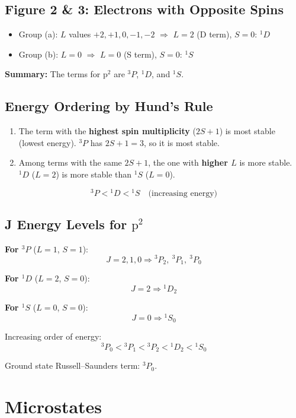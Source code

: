 \documentclass[12pt,a4paper]{article}
\begin{document}
\subsection*{Figure 2 \& 3: Electrons with Opposite Spins}
\begin{itemize}
  \item Group (a): $L$ values $+2,+1,0,-1,-2$ $\Rightarrow$ $L=2$ (D term), $S=0$: ${}^1D$
  \item Group (b): $L = 0$ $\Rightarrow$ $L=0$ (S term), $S=0$: ${}^1S$
\end{itemize}

\textbf{Summary:} The terms for $\mathrm{p}^2$ are ${}^3P$, ${}^1D$, and ${}^1S$.

\subsection{Energy Ordering by Hund's Rule}

\begin{enumerate}
  \item The term with the \textbf{highest spin multiplicity} ($2S+1$) is most stable (lowest energy). ${}^3P$ has $2S+1 = 3$, so it is most stable.
  \item Among terms with the same $2S+1$, the one with \textbf{higher $L$} is more stable. ${}^1D$ ($L=2$) is more stable than ${}^1S$ ($L=0$).
\end{enumerate}

\[
{}^3P < {}^1D < {}^1S \quad \text{(increasing energy)}
\]

\subsection{J Energy Levels for $\mathrm{p}^2$}

\textbf{For ${}^3P$} ($L=1$, $S=1$):
\[
J = 2, 1, 0 \Rightarrow {}^3P_2,\ {}^3P_1,\ {}^3P_0
\]

\textbf{For ${}^1D$} ($L=2$, $S=0$):
\[
J = 2 \Rightarrow {}^1D_2
\]

\textbf{For ${}^1S$} ($L=0$, $S=0$):
\[
J = 0 \Rightarrow {}^1S_0
\]

Increasing order of energy:
\[
{}^3P_0 < {}^3P_1 < {}^3P_2 < {}^1D_2 < {}^1S_0
\]

Ground state Russell--Saunders term: ${}^3P_0$.

\section{Microstates}
\end{document}

